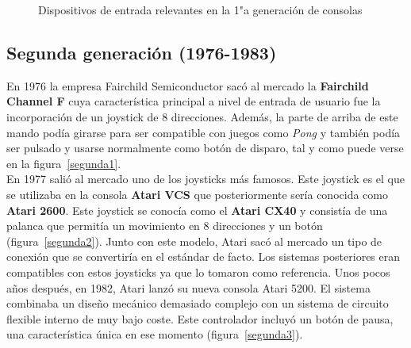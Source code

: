 \begin{figure}[t]
     \hfill
     \caption{Dispositivos de entrada relevantes en la 1"a  generaci\'on de consolas}
     \label{fig:primera}
   \end{figure}

\subsection{Segunda generaci\'on (1976-1983)}


En 1976 la empresa Fairchild Semiconductor sac\'o al mercado la \textbf{Fairchild Channel F} cuya caracter\'istica principal a nivel de entrada de usuario fue la incorporaci\'on de un joystick de 8 direcciones.  Adem\'as, la parte de arriba de este mando pod\'ia girarse para ser compatible con juegos como \textit{Pong} y tambi\'en pod\'ia ser pulsado y usarse normalmente como bot\'on de disparo, tal y como puede verse en la figura~\ref{segunda1}. \\

En 1977 sali\'o al mercado uno de los joysticks m\'as famosos. Este joystick es el que se utilizaba en la consola \textbf{Atari VCS} que posteriormente ser\'ia conocida como \textbf{Atari 2600}. Este joystick se conoc\'ia como el \textbf{Atari CX40} y consist\'ia de una palanca que permit\'ia un movimiento en 8 direcciones y un bot\'on (figura~\ref{segunda2}). Junto con este modelo, Atari sac\'o al mercado un tipo de conexi\'on que se convertir\'ia en el est\'andar de facto. Los sistemas posteriores eran compatibles con estos joysticks ya que lo tomaron como referencia. Unos pocos a\~nos despu\'es, en 1982, Atari lanz\'o su nueva consola Atari 5200. El sistema combinaba un dise\~no mec\'anico demasiado complejo con un sistema de circuito flexible interno de muy bajo coste. Este controlador incluy\'o un bot\'on de pausa, una caracter\'istica \'unica en ese momento (figura~\ref{segunda3}).\\


